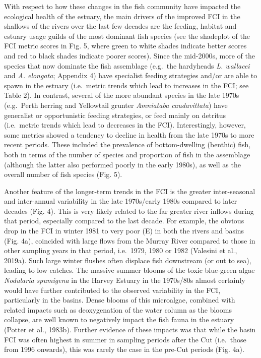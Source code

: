 \documentclass[
]{book}
\begin{document}
With respect to how these changes in the fish community have impacted the ecological health of the estuary, the main drivers of the improved FCI in the shallows of the rivers over the last few decades are the feeding, habitat and estuary usage guilds of the most dominant fish species (see the shadeplot of the FCI metric scores in Fig. 5, where green to white shades indicate better scores and red to black shades indicate poorer scores). Since the mid-2000s, more of the species that now dominate the fish assemblage (e.g.~the hardyheads \emph{L. wallacei} and \emph{A. elongata}; Appendix 4) have specialist feeding strategies and/or are able to spawn in the estuary (i.e.~metric trends which lead to increases in the FCI; see Table 2). In contrast, several of the more abundant species in the late 1970s (e.g.~Perth herring and Yellowtail grunter \emph{Amniataba caudavittata}) have generalist or opportunistic feeding strategies, or feed mainly on detritus (i.e.~metric trends which lead to decreases in the FCI). Interestingly, however, some metrics showed a tendency to decline in health from the late 1970s to more recent periods. These included the prevalence of bottom-dwelling (benthic) fish, both in terms of the number of species and proportion of fish in the assemblage (although the latter also performed poorly in the early 1980s), as well as the overall number of fish species (Fig. 5).

Another feature of the longer-term trends in the FCI is the greater inter-seasonal and inter-annual variability in the late 1970s/early 1980s compared to later decades (Fig. 4). This is very likely related to the far greater river inflows during that period, especially compared to the last decade. For example, the obvious drop in the FCI in winter 1981 to very poor (E) in both the rivers and basins (Fig. 4a), coincided with large flows from the Murray River compared to those in other sampling years in that period, i.e.~1979, 1980 or 1982 (Valesini et al., 2019a). Such large winter flushes often displace fish downstream (or out to sea), leading to low catches. The massive summer blooms of the toxic blue-green algae \emph{Nodularia spumigena} in the Harvey Estuary in the 1970s/80s almost certainly would have further contributed to the observed variability in the FCI, particularly in the basins. Dense blooms of this microalgae, combined with related impacts such as deoxygenation of the water column as the blooms collapse, are well known to negatively impact the fish fauna in the estuary (Potter et al., 1983b). Further evidence of these impacts was that while the basin FCI was often highest in summer in sampling periods after the Cut (i.e.~those from 1996 onwards), this was rarely the case in the pre-Cut periods (Fig. 4a).~
\end{document}
